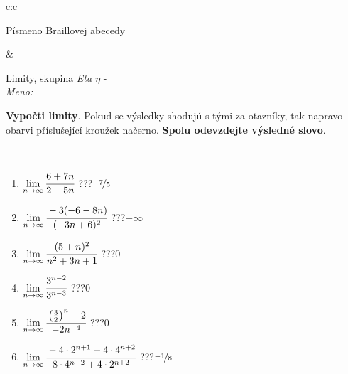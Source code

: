\documentclass[10pt]{report}
\begin{document}
\begin{tabular}{c:c}
\begin{minipage}[c][104.5mm][t]{0.5\linewidth}
\begin{center}
\begin{minipage}{0.20\linewidth}
\begin{center}
{\small Písmeno Braillovej abecedy}
\end{center}
\end{minipage}
\end{center}
\end{minipage}
&
\begin{minipage}[c][104.5mm][t]{0.5\linewidth}
\begin{center}
\vspace{7mm}
{\huge Limity, skupina \textit{Eta $\eta$} -}\\[5mm]
\textit{Meno:}\phantom{xxxxxxxxxxxxxxxxxxxxxxxxxxxxxxxxxxxxxxxxxxxxxxxxxxxxxxxxxxxxxxxxx}\\[5mm]
\begin{minipage}{0.95\linewidth}
\begin{center}
\textbf{Vypočti limity}. Pokud se výsledky shodujú s tými za otazníky, tak napravo\\obarvi příslušející kroužek načerno. \textbf{Spolu odevzdejte výsledné slovo}.
\end{center}
\end{minipage}
\\[1mm]
\begin{minipage}{0.79\linewidth}
\begin{center}
\begin{varwidth}{\linewidth}
\begin{enumerate}
\normalsize
\item $\lim\limits_{n\to\infty}\cfrac{6+7n}{2-5n}$\quad \dotfill\; ???\;\dotfill \quad $\nicefrac{-7}{5}$
\item $\lim\limits_{n\to\infty}\cfrac{-3(-6-8n)}{(-3n+6)^2}$\quad \dotfill\; ???\;\dotfill \quad $-\infty$
\item $\lim\limits_{n\to\infty}\cfrac{(5+n)^2}{n^2+3n+1}$\quad \dotfill\; ???\;\dotfill \quad $0$
\item $\lim\limits_{n\to\infty}\cfrac{3^{n-2}}{3^{n-3}}$\quad \dotfill\; ???\;\dotfill \quad $0$
\item $\lim\limits_{n\to\infty}\cfrac{\left(\frac{3}{2}\right)^n -2}{-2n^{-4}}$\quad \dotfill\; ???\;\dotfill \quad $0$
\item $\lim\limits_{n\to\infty}\cfrac{-4\cdot 2^{n+1}-4\cdot 4^{n+2}}{8\cdot 4^{n-2}+4\cdot 2^{n+2}}$\quad \dotfill\; ???\;\dotfill \quad $\nicefrac{-1}{8}$
\end{enumerate}
\end{varwidth}
\end{center}
\end{minipage}
\begin{minipage}{0.20\linewidth}

\end{minipage}
\end{center}
\end{minipage}
\end{tabular}
\end{document}
